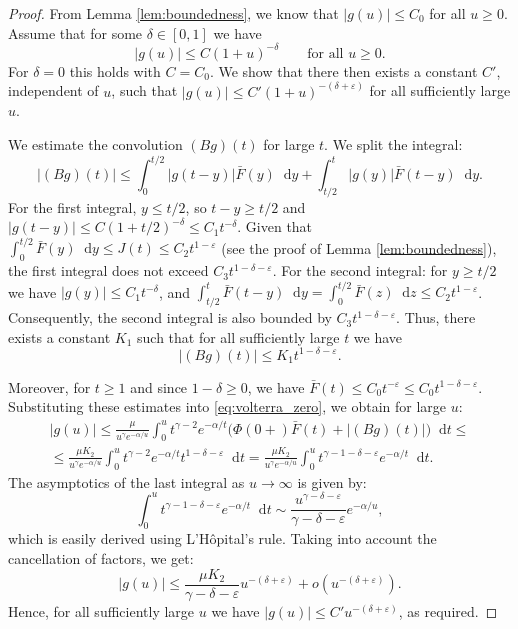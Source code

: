\documentclass[10pt,a4paper]{amsart}
\providecommand{\diff}{\mathop{}\!\mathrm{d}}
\begin{document}
\begin{proof}
From Lemma \ref{lem:boundedness}, we know that $|g(u)| \le C_0$ for all $u\ge0$. Assume that for some $\delta \in [0,1]$ we have
\[
|g(u)| \le C (1+u)^{-\delta} \qquad \text{for all } u \ge 0.
\]
For $\delta = 0$ this holds with $C = C_0$. We show that there then exists a constant $C'$, independent of $u$, such that $|g(u)| \le C' (1+u)^{-(\delta+\varepsilon)}$ for all sufficiently large $u$.

We estimate the convolution $(Bg)(t)$ for large $t$. We split the integral:
\[
|(Bg)(t)| \le \int_0^{t/2} |g(t-y)| \bar F(y) \diff y + \int_{t/2}^t |g(y)| \bar F(t-y) \diff y.
\]
For the first integral, $y \le t/2$, so $t-y \ge t/2$ and $|g(t-y)| \le C (1+t/2)^{-\delta} \le C_1 t^{-\delta}$. Given that $\int_0^{t/2} \bar F(y) \diff y \le J(t) \le C_2 t^{1-\varepsilon}$ (see the proof of Lemma \ref{lem:boundedness}), the first integral does not exceed $C_3 t^{1-\delta-\varepsilon}$. For the second integral: for $y \ge t/2$ we have $|g(y)| \le C_1 t^{-\delta}$, and $\int_{t/2}^t \bar F(t-y) \diff y = \int_0^{t/2} \bar F(z) \diff z \le C_2 t^{1-\varepsilon}$. Consequently, the second integral is also bounded by $C_3 t^{1-\delta-\varepsilon}$. Thus, there exists a constant $K_1$ such that for all sufficiently large $t$ we have
\[
|(Bg)(t)| \le K_1 t^{1-\delta-\varepsilon}.
\]

Moreover, for $t \ge 1$ and since $1-\delta \ge 0$, we have $\bar F(t) \le C_0 t^{-\varepsilon} \le C_0 t^{1-\delta-\varepsilon}$. Substituting these estimates into \eqref{eq:volterra_zero}, we obtain for large $u$:
\begin{multline*}
|g(u)| \le \frac{\mu}{u^\gamma e^{-\alpha/u}} \int_0^u t^{\gamma-2} e^{-\alpha/t} \bigl( \Phi(0+)\bar F(t) + |(Bg)(t)| \bigr) \diff t \le
\\
\le \frac{\mu K_2}{u^\gamma e^{-\alpha/u}} \int_0^u t^{\gamma-2} e^{-\alpha/t} t^{1-\delta-\varepsilon} \diff t
= \frac{\mu K_2}{u^\gamma e^{-\alpha/u}} \int_0^u t^{\gamma-1-\delta-\varepsilon} e^{-\alpha/t} \diff t.
\end{multline*}
The asymptotics of the last integral as $u\to\infty$ is given by:
\[
\int_0^u t^{\gamma-1-\delta-\varepsilon} e^{-\alpha/t} \diff t \sim \frac{u^{\gamma-\delta-\varepsilon}}{\gamma-\delta-\varepsilon} e^{-\alpha/u},
\]
which is easily derived using L'Hôpital's rule. Taking into account the cancellation of factors, we get:
\[
|g(u)| \le \frac{\mu K_2}{\gamma-\delta-\varepsilon} u^{-(\delta+\varepsilon)} + o(u^{-(\delta+\varepsilon)}).
\]
Hence, for all sufficiently large $u$ we have $|g(u)| \le C' u^{-(\delta+\varepsilon)}$, as required.


\end{proof}
\end{document}
